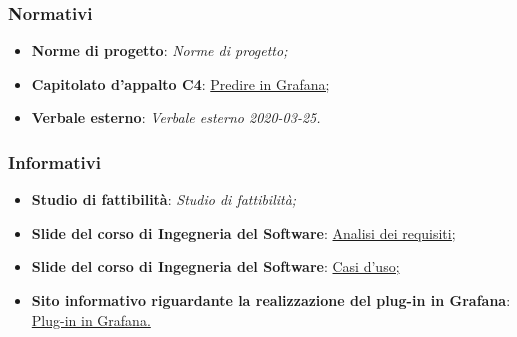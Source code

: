\documentclass[../analisi-dei-requisiti.tex]{subfiles}
\begin{document}
\subsubsection{Normativi}%
\label{sssec:normativi}

\begin{itemize}
  \item \textbf{Norme di progetto}: \textit{Norme di progetto;}
  \item \textbf{Capitolato d'appalto C4}: \href{https://www.math.unipd.it/~tullio/IS-1/2019/Progetto/C4.pdf}{Predire in Grafana;}
  \item \textbf{Verbale esterno}: \textit{Verbale esterno 2020-03-25.}
\end{itemize}

\subsubsection{Informativi}%
\label{sssec:informativi}

\begin{itemize}
  \item \textbf{Studio di fattibilità}: \textit{Studio di fattibilità;}
  \item \textbf{Slide del corso di Ingegneria del Software}: \href{https://www.math.unipd.it/~tullio/IS-1/2019/Dispense/L08.pdf}{Analisi dei requisiti;}
  \item \textbf{Slide del corso di Ingegneria del Software}: \href{https://www.math.unipd.it/~tullio/IS-1/2019/Dispense/E03.pdf}{Casi d'uso;}
  \item \textbf{Sito informativo riguardante la realizzazione del plug-in in Grafana}: \href{https://grafana.com/docs/grafana/latest/plugins/}{Plug-in in Grafana.}
\end{itemize}
\end{document}
